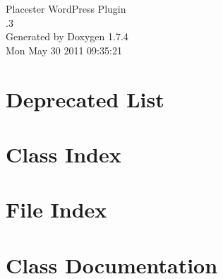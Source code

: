 \documentclass[a4paper]{book}
\begin{document}
\hypersetup{pageanchor=false}
\begin{titlepage}
\vspace*{7cm}
\begin{center}
{\Large Placester WordPress Plugin \\[1ex]\large .3 }\\
\vspace*{1cm}
{\large Generated by Doxygen 1.7.4}\\
\vspace*{0.5cm}
{\small Mon May 30 2011 09:35:21}\\
\end{center}
\end{titlepage}
\clearemptydoublepage
{}
\tableofcontents
\clearemptydoublepage
{}
\hypersetup{pageanchor=true}
\chapter{Deprecated List}
\label{deprecated}
\hypertarget{deprecated}{}

\chapter{Class Index}

\chapter{File Index}

\chapter{Class Documentation}


\end{document}
